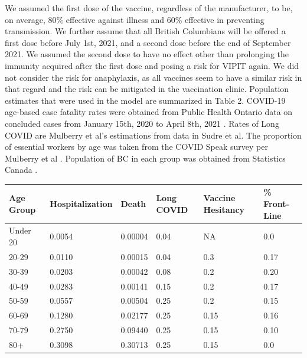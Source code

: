 \documentclass[]{interact}
\theoremstyle{plain}%
\theoremstyle{definition}
\theoremstyle{remark}
\begin{document}
We assumed the first dose of the vaccine, regardless of the
manufacturer, to be, on average, 80\% effective against illness and 60\%
effective in preventing transmission. We further assume that all British
Columbians will be offered a first dose before July 1st, 2021, and a
second dose before the end of September 2021. We assumed the second dose
to have no effect other than prolonging the immunity acquired after the
first dose and posing a risk for VIPIT again. We did not consider the
risk for anaphylaxis, as all vaccines seem to have a similar risk in
that regard and the risk can be mitigated in the vaccination clinic.
Population estimates that were used in the model are summarized in Table
2. COVID-19 age-based case fatality rates were obtained from Public
Health Ontario data on concluded cases from January 15th, 2020 to April
8th, 2021 \citep{public_health_ontario_all_2021}. Rates of Long COVID
are Mulberry et al's estimations from data in Sudre et
al\citep{sudre_attributes_2021}. The proportion of essential workers by
age was taken from the COVID Speak survey per Mulberry et al
\citep{mulberry_vaccine_2021}. Population of BC in each group was
obtained from Statistics Canada \citep{statistics_canada_census_2017}.

\begin{table}
{\begin{tabular}{llllll} \toprule
Age  Group & Hospitalization & Death   & Long COVID & Vaccine Hesitancy & \% Front-Line \\ \hline
Under 20   & 0.0054          & 0.00004 & 0.04       & NA                & 0.0           \\ 
20-29      & 0.0110          & 0.00015 & 0.04       & 0.3               & 0.17          \\ 
30-39      & 0.0203          & 0.00042 & 0.08       & 0.2               & 0.20          \\ 
40-49      & 0.0283          & 0.00141 & 0.15       & 0.2               & 0.17          \\ 
50-59      & 0.0557          & 0.00504 & 0.25       & 0.2               & 0.15          \\ 
60-69      & 0.1280          & 0.02177 & 0.25       & 0.15              & 0.16          \\ 
70-79      & 0.2750          & 0.09440 & 0.25       & 0.15              & 0.10          \\ 
80+        & 0.3098          & 0.30713 & 0.25       & 0.15              & 0.0           \\ \bottomrule
\end{tabular}}
\label{model-param}
\end{table}
\end{document}
